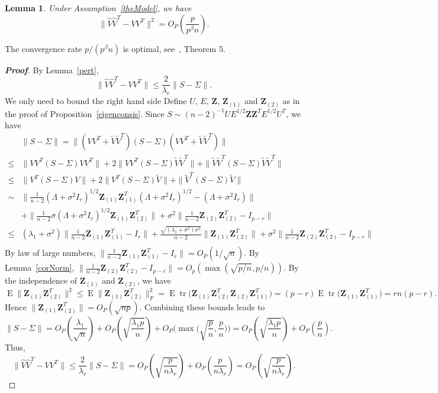 \documentclass[review]{elsarticle}
\DeclareMathOperator{\mytr}{tr}
\DeclareMathOperator{\myE}{E}
\newcommand{\bZ}{\mathbf{Z}}
\theoremstyle{plain}
\newtheorem{lemma}{\quad\quad Lemma}
\theoremstyle{definition}
\theoremstyle{remark}
\begin{document}
\begin{lemma}\label{conRateLemma}
    Under Assumption~\ref{theModel}, we have
\begin{equation*}
\|\hat{V}\hat{V}^T-VV^T\|^2 =O_P(\frac{p}{p^{\beta}n}).
\end{equation*}
\end{lemma}
The convergence rate $p/(p^{\beta}n)$ is optimal, see~\cite{Cai2012Sparse}, Theorem 5.
{\color{red}
\begin{proof}[\textbf{Proof}]
    By Lemma~\ref{pert},
    $$
    \|\hat{V}\hat{V}^T - VV ^T\|\leq \frac{2}{\lambda_r}\|S-\Sigma\|.
    $$
    We only need to bound the right hand side
    Define $U$, $E$, $\bZ$, $\bZ_{(1)}$ and $\bZ_{(2)}$ as in the proof of Proposition~\ref{eigenconsis}.
    Since $S\sim (n-2)^{-1}UE^{1/2}\bZ \bZ^T E^{1/2} U^T$, we have
    $$
    \begin{aligned}
        &\|S-\Sigma\|=
        \|(VV^T+\tilde{V}\tilde{V}^T)(S-\Sigma)(VV^T+\tilde{V}\tilde{V}^T)\|\\
        \leq& \|VV^T (S-\Sigma) VV^T\|+2 \|VV^T (S-\Sigma) \tilde{V}\tilde{V}^T\|+\|\tilde{V}\tilde{V}^T (S-\Sigma) \tilde{V}\tilde{V}^T\|\\
        \leq& \|V^T (S-\Sigma) V\|+2 \|V^T (S-\Sigma) \tilde{V}\|+\|\tilde{V}^T (S-\Sigma) \tilde{V}\|\\
        \sim &
        \big\|\frac{1}{n-2}(\Lambda+\sigma^2 I_r)^{1/2}\bZ_{(1)} \bZ_{(1)}^T(\Lambda+\sigma^2 I_r)^{1/2}-(\Lambda+\sigma^2 I_r)\big\|\\
        &+
        \big\|\frac{1}{n-2}\sigma(\Lambda+\sigma^2 I_r)^{1/2}\bZ_{(1)} \bZ_{(2)}^T\big\|+
        \sigma^2\big\|\frac{1}{n-2}\bZ_{(2)} \bZ_{(2)}^T- I_{p-r}\big\|\\
        \leq & (\lambda_1+\sigma^2) \|\frac{1}{n-2}\bZ_{(1)}\bZ_{(1)}^T-I_r\|
        +\frac{\sqrt{(\lambda_1+\sigma^2)\sigma^2}}{n-2}\|\bZ_{(1)}\bZ_{(2)}^T\|+
        \sigma^2\big\|\frac{1}{n-2}\bZ_{(2)} \bZ_{(2)}^T- I_{p-r}\big\|\\
    \end{aligned}
    $$
    By law of large numbers, $\|\frac{1}{n-2}\bZ_{(1)}\bZ_{(1)}^T-I_r\|=O_P(1/\sqrt{n})$.
    By Lemma~\ref{corNorm}, $\big\|\frac{1}{n-2}\bZ_{(2)} \bZ_{(2)}^T- I_{p-r}\big\|=O_p(\max(\sqrt{p/n},p/n))$.
    By the independence of $\bZ_{(1)}$ and $\bZ_{(2)}$, we have
    $$
    \myE \|\bZ_{(1)}\bZ_{(2)}^T\|^2\leq
    \myE \|\bZ_{(1)}\bZ_{(2)}^T\|_F^2
    =
    \myE \mytr\big(\bZ_{(1)}\bZ_{(2)}^T\bZ_{(2)}\bZ_{(1)}^T\big)
    =(p-r)
    \myE \mytr\big(\bZ_{(1)}\bZ_{(1)}^T\big)
    =rn(p-r).
    $$
    Hence $\|\bZ_{(1)}\bZ_{(2)}^T\|=O_P(\sqrt{np})$.
    Combining these bounds leads to
    $$
    \|S-\Sigma\|=
    O_P(\frac{\lambda_1}{\sqrt{n}})+O_P(\sqrt{\frac{\lambda_1 p}{n}})+O_P\Big(\max\big(\sqrt{\frac{p}{n}},\frac{p}{n}\big)\Big)
    =
    O_P(\sqrt{\frac{\lambda_1 p}{n}})+O_P(\frac{p}{n}).
    $$
    Thus,
    $$
    \|\hat{V}\hat{V}^T- VV^T\|\leq \frac{2}{\lambda_r}\|S-\Sigma\|=
    O_P(\sqrt{\frac{p}{n\lambda_r}})+O_P(\frac{p}{n\lambda_r})=
O_P(\sqrt{\frac{p}{n\lambda_r}}).
    $$

\end{proof}
}
\end{document}
